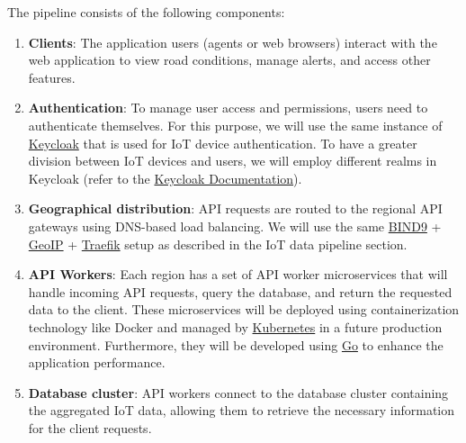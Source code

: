 The pipeline consists of the following components:

\begin{enumerate}
	\item \textbf{Clients}: The application users (agents or web browsers) interact with the web application to view road conditions, manage alerts, and access other features.
	\item \textbf{Authentication}: To manage user access and permissions, users need to authenticate themselves. For this purpose, we will use the same instance of \href{https://www.keycloak.org/}{Keycloak} that is used for IoT device authentication. To have a greater division between IoT devices and users, we will employ different realms in Keycloak (refer to the \href{https://www.keycloak.org/docs/latest/server_admin/index.html#core-concepts-and-terms}{Keycloak Documentation}).
	\item \textbf{Geographical distribution}: API requests are routed to the regional API gateways using DNS-based load balancing. We will use the same \href{https://www.isc.org/bind/}{BIND9} + \href{https://www.maxmind.com/en/geoip2-databases}{GeoIP} + \href{https://traefik.io/}{Traefik} setup as described in the IoT data pipeline section.
	\item \textbf{API Workers}: Each region has a set of API worker microservices that will handle incoming API requests, query the database, and return the requested data to the client. These microservices will be deployed using containerization technology like Docker and managed by \href{https://kubernetes.io/}{Kubernetes} in a future production environment. Furthermore, they will be developed using \href{https://golang.org/}{Go} to enhance the application performance.
	\item \textbf{Database cluster}: API workers connect to the database cluster containing the aggregated IoT data, allowing them to retrieve the necessary information for the client requests.
\end{enumerate}
